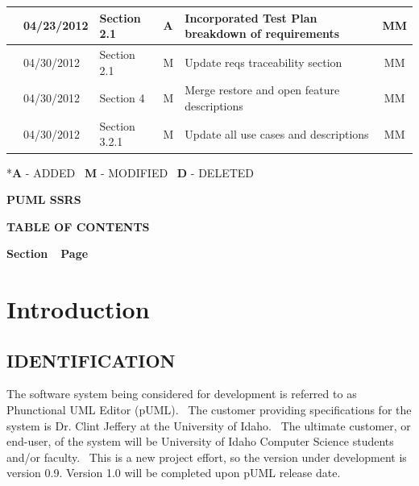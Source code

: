 \documentclass[twoside,letterpaper]{article}
\begin{document}
\begin{flushleft}
\begin{supertabular}[c]{|m{0.75in}|m{1.0in}|m{1.5in}|m{0.25in}|m{2in}|c|}
\\\hline
{}
& 04/23/2012
& Section 2.1
& \centering A
& Incorporated Test Plan breakdown of requirements
& MM

\\\hline
{}
& 04/30/2012
& Section 2.1 
& \centering M
& Update reqs traceability section 
& MM

\\\hline
{}
& 04/30/2012
& Section 4 
& \centering M
& Merge restore and open feature descriptions   
& MM

\\\hline
{}
& 04/30/2012
& Section 3.2.1
& \centering M
& Update all use cases and descriptions
& MM


\\\hline
\end{supertabular}
\end{flushleft}










{
{*}{\textbf{A}}{
- ADDED
\ }{\textbf{M}}{ -
MODIFIED
\ }{\textbf{D}}{ -
DELETED}}

\clearpage
{\centering\bfseries {\MakeUppercase{pUML SSRS}}
\par}

{\centering\bfseries
TABLE OF CONTENTS
\par}


\bigskip

{\bfseries
Section\ \ Page}

\setcounter{tocdepth}{9}
\renewcommand\contentsname{}
\tableofcontents

\bigskip








\clearpage\clearpage\setcounter{page}{1}\pagestyle{Convertii}
\section[Introduction]{\bfseries
Introduction}

\subsection[IDENTIFICATION]{\bfseries
IDENTIFICATION}
{
The software system being considered for development is referred to as Phunctional UML Editor (pUML). \ The customer providing specifications
for the system is Dr. Clint Jeffery at the University of Idaho. \ The ultimate
customer, or end-user, of the system will be University of Idaho Computer Science students and/or faculty. \ This is a new project effort, so the version under development is version 0.9.
\newline Version 1.0 will be completed upon pUML release date.}
\end{document}
